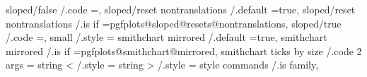 {{{{{{{{{{{{{{{{{{{{{{{{{{{{{{{{{{{{{{{{{{{{{{{{{{{{{sloped/false                                 /.code                                                                                    ={\pgfplots@slopedfalse},                                                                                           
sloped/reset nontranslations                 /.default                                                                                 =true,                                                                                                              
sloped/reset nontranslations                 /.is if                                                                                   =pgfplots@sloped@resets@nontranslations,                                                                            
sloped/true                                  /.code                                                                                    ={\pgfplots@slopedtrue},                                                                                            
small                                        /.style                                                                                   ={                                                                                                                  
smithchart mirrored                          /.default                                                                                 =true,                                                                                                              
smithchart mirrored                          /.is if                                                                                   =pgfplots@smithchart@mirrored,                                                                                      
smithchart ticks by size                     /.code 2 args                                                                             ={%
string <                                     /.style                                                                                   ={%
string >                                     /.style                                                                                   ={%
style commands                               /.is family,                                                                        
}}}}}}}}}}}}}}}}}}}}}}}}}}}}}}}}}}}}}}}}}}}}}}}}}}}}}}}}}
